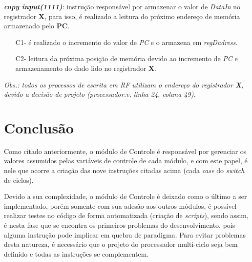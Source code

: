 \documentclass[12pt, a4paper]{article}
\begin{document}
	\par \textit{\textbf{copy input(1111)}}: instrução responsável por armazenar o valor de \textit{DataIn} no registrador \textbf{X}, para isso, é realizado a leitura do próximo endereço de memória armazenado pelo \textbf{PC}.
	
    \begin{enumerate}
        \item[C1-] é realizado o incremento do valor de \textit{PC} e o armazena em \textit{regDadress}.
        \item[C2-] leitura da próxima posição de memória devido ao incremento de \textit{PC} e armazenamento do dado lido no registrador \textbf{X}.
    \end{enumerate}

	\textit{Obs.: todos os processos de escrita em RF utilizam o endereço do registrador \textbf{X}, devido a decisão de projeto (processador.v, linha 24, coluna 49).}

	\section{Conclusão}
	
	\par Como citado anteriormente, o módulo de Controle é responsável por gerenciar os valores assumidos pelas variáveis de controle de cada módulo, e com este papel, é nele que ocorre a criação das nove instruções citadas acima (cada \textit{case} do \textit{switch} de ciclos). \newline
	
	\par Devido a sua complexidade, o módulo de Controle é deixado como o último a ser implementado, porém somente com sua adesão aos outros módulos, é possível realizar testes no código de forma automatizada (criação de \textit{scripts}), sendo assim, é nesta fase que se encontra os primeiros problemas do desenvolvimento, pois alguma instrução pode implicar em quebra de paradigma. Para evitar problemas desta natureza, é necessário que o projeto do processador multi-ciclo seja bem definido e todas as instruções se complementem. \newline
\end{document}
